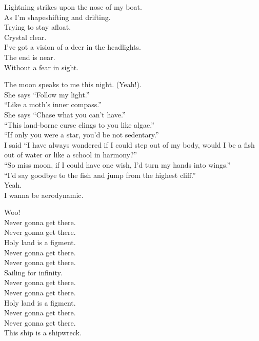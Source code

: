 Lightning strikes upon the nose of my boat. \\
As I'm shapeshifting and drifting. \\
Trying to stay afloat. \\
Crystal clear. \\
I've got a vision of a deer in the headlights. \\
The end is near. \\
Without a fear in sight. \\


The moon speaks to me this night. (Yeah!). \\
She says ``Follow my light.'' \\
``Like a moth's inner compass.'' \\
She says ``Chase what you can't have.'' \\
``This land-borne curse clings to you like algae.'' \\
``If only you were a star, you'd be not sedentary.'' \\
I said ``I have always wondered if I could step out of my body, would I be a fish out of water or like a school in harmony?'' \\
``So miss moon, if I could have one wish, I'd turn my hands into wings.'' \\
``I'd say goodbye to the fish and jump from the highest cliff.'' \\

Yeah. \\
I wanna be aerodynamic. \\


Woo! \\
Never gonna get there. \\
Never gonna get there. \\
Holy land is a figment. \\
Never gonna get there. \\
Never gonna get there. \\
Sailing for infinity. \\
Never gonna get there. \\
Never gonna get there. \\
Holy land is a figment. \\
Never gonna get there. \\
Never gonna get there. \\
This ship is a shipwreck. \\

